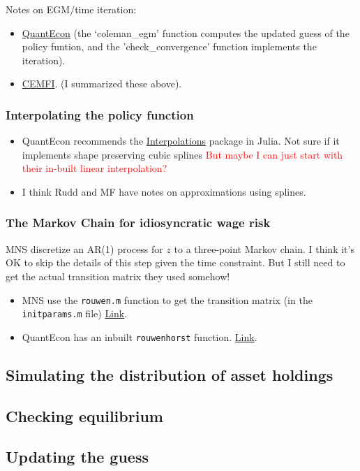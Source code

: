 \documentclass[12pt]{article}
\begin{document}
Notes on EGM/time iteration:
\begin{itemize}
\item \href{https://lectures.quantecon.org/jl/egm_policy_iter.html}{QuantEcon} (the `coleman\_egm' function computes the updated guess of the policy funtion, and the 'check\_convergence' function implements the iteration).
\item \href{https://www.cemfi.es/~pijoan/Teaching_files/Notes%20on%20endogenous%20grid%20method.pdf}{CEMFI}. (I summarized these above).
\end{itemize}


\subsubsection{Interpolating the policy function}
\begin{itemize}
\item QuantEcon recommends the \href{https://github.com/JuliaMath/Interpolations.jl}{Interpolations} package in Julia. Not sure if it implements shape preserving cubic splines \textcolor{red}{But maybe I can just start with their in-built linear interpolation?}
\item I think Rudd and MF have notes on approximations using splines.
\end{itemize}

\subsubsection{The Markov Chain for idiosyncratic wage risk}
MNS discretize an AR(1) process for $z$ to a three-point Markov chain. I think it's OK to skip the details of this step given the time constraint. But I still need to get the actual transition matrix they used somehow!
\begin{itemize}
\item MNS use the \verb|rouwen.m| function to get the transition matrix (in the \verb|initparams.m| file) \href{https://sites.google.com/site/dlkhagva/research/matlab-codes-for-the-rouwenhorst-method}{Link}.
\item QuantEcon has an inbuilt \verb|rouwenhorst| function. \href{https://github.com/QuantEcon/QuantEcon.jl/blob/master/src/markov/markov_approx.jl}{Link}.
\end{itemize}



\subsection{Simulating the distribution of asset holdings}

\subsection{Checking equilibrium}

\subsection{Updating the guess}
\end{document}
